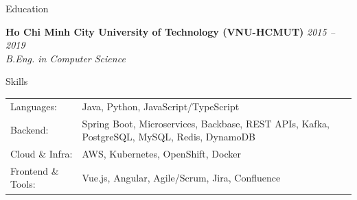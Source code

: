 \documentclass{resume} %
\begin{document}

\begin{rSection}{Education}

{\bf Ho Chi Minh City University of Technology (VNU-HCMUT)} \hfill {\em 2015 -- 2019}
\\{ \textit {B.Eng. in Computer Science}}

\end{rSection}

\begin{rSection}{Skills}
\begin{tabular}{@{}p{}p{}@{}}
Languages: & Java, Python, JavaScript/TypeScript \\
Backend: & Spring Boot, Microservices, Backbase, REST APIs, Kafka, PostgreSQL, MySQL, Redis, DynamoDB \\
Cloud \& Infra: & AWS, Kubernetes, OpenShift, Docker \\
Frontend \& Tools: & Vue.js, Angular, Agile/Scrum, Jira, Confluence
\end{tabular}
\end{rSection}
\end{document}
